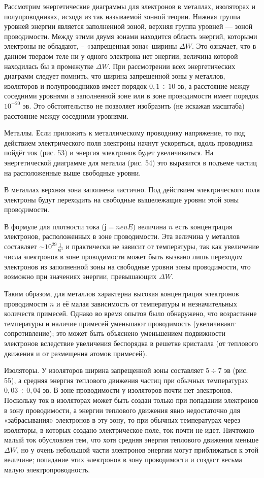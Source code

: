 \documentclass[a4paper,10pt]{book}
\begin{document}
Рассмотрим энергетические диаграммы для электронов в металлах, изоляторах и полупроводниках, исходя из так называемой зонной теории. Нижняя группа уровней энергии является заполненной зоной, верхняя группа уровней — зоной проводимости. Между этими двумя зонами находится область энергий, которыми электроны не обладают, -- «запрещенная зона» ширины $\Delta W$. Это означает, что в данном твердом теле ни у одного электрона нет энергии, величина которой находилась бы в промежутке $\Delta W$. При рассмотрении всех энергетических диаграмм следует помнить, что ширина запрещенной зоны у металлов, изоляторов и полупроводников имеет порядок $0,1 \div 10 \textit{ эв}$, а расстояние между соседними уровнями в заполненной зоне или в зоне проводимости имеет порядок $10^{-20}\textit{ эв}$. Это обстоятельство не позволяет изобразить (не искажая масштаба) расстояние между соседними уровнями.

$\textbf{Металлы.}$ Если приложить к металлическому проводнику напряжение, то под действием электрического поля электроны начнут ускоряться, вдоль проводника пойдёт ток (рис. 53) и энергия электронов будет увеличиваться. На энергетической диаграмме для металла (рис. 54) это выразится в подъеме частиц на расположенные выше свободные уровни.

В металлах верхняя зона заполнена частично. Под действием электрического поля электроны будут переходить на свободные вышележащие уровни этой зоны проводимости.

В формуле для плотности тока ($ј=neuE$) величина $n$ есть концентрация электронов, расположенных в зоне проводимости. Эта величина у металлов составляет $\sim 10^{29}\frac{1}{\textit{м}^3}$ и практически не зависит от температуры, так как увеличение числа электронов в зоне проводимости может быть вызвано лишь переходом электронов из заполненной зоны на свободные уровни зоны проводимости, что возможно при значениях энергии, превышающих $\Delta W$.

Таким образом, для металлов характерна высокая концентрация электронов проводимости $n$ и её малая зависимость от температуры и незначительных количеств примесей. Однако во время опытов было обнаружено, что возрастание температуры и наличие примесей уменьшают проводимость (увеличивают сопротивление); это может быть объяснено уменьшением подвижности электронов вследствие увеличения беспорядка в решетке кристалла (от теплового движения и от размещения атомов примесей).

$\textbf{Изоляторы.}$ У изоляторов ширина запрещенной зоны составляет $5 \div 7 \textit{ эв}$ (рис. 55), а средняя энергия теплового движения частиц при обычных температурах $0,03 \div 0,04 \textit{ эв}$. В зоне проводимости у изоляторов почти нет электронов. Поскольку ток в изоляторах может быть создан только при попадании электронов в зону проводимости, а энергии теплового движения явно недостаточно для «забрасывания» электронов в эту зону, то при обычных температурах через изоляторы, в которых создано электрическое поле, ток почти не идет. Ничтожно малый ток обусловлен тем, что хотя средняя энергия теплового движения меньше $\Delta W$, но у очень небольшой части электронов энергии могут приближаться к этой величине; попадание этих электронов в зону проводимости и создаст весьма малую электропроводность.
\end{document}
